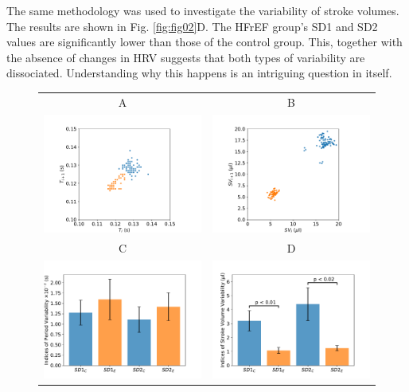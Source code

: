 \documentclass[%
preprint,
 amsmath,amssymb,
 aps,
]{revtex4-2}
\begin{document}
The same methodology was used to investigate the variability of stroke volumes. The results are shown in Fig. \ref{fig:fig02}D. The HFrEF group's SD1 and SD2 values are significantly lower than those of the control group. This, together with the absence of changes in HRV suggests that both types of variability are dissociated. Understanding why this happens is an intriguing question in itself. 

\begin{figure}[h!]
    \begin{tabular}{cc}
        A & B \\
        \includegraphics[width=3in]{Fig02_A.pdf} &
        \includegraphics[width=3in]{Fig02_B.pdf} \\
        C & D \\
        \includegraphics[width=3in]{Fig02_C.pdf} &
        \includegraphics[width=3in]{Fig02_D.pdf}

\end{tabular}
\end{figure}
\end{document}
